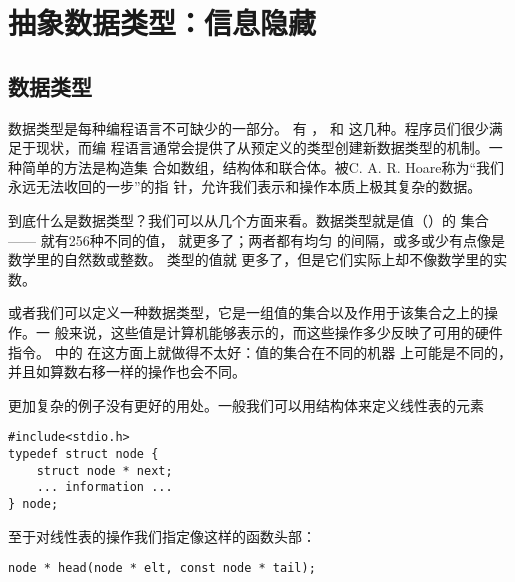 

\chapter{抽象数据类型：信息隐藏}

\section{数据类型}


数据类型是每种编程语言不可缺少的一部分。 有 ，
 和  这几种。程序员们很少满足于现状，而编
程语言通常会提供了从预定义的类型创建新数据类型的机制。一种简单的方法是构造集
合如数组，结构体和联合体。被C. A. R. Hoare称为“我们永远无法收回的一步”的指
针，允许我们表示和操作本质上极其复杂的数据。

到底什么是数据类型？我们可以从几个方面来看。数据类型就是值（）的
集合—— 就有256种不同的值， 就更多了；两者都有均匀
的间隔，或多或少有点像是数学里的自然数或整数。 类型的值就
更多了，但是它们实际上却不像数学里的实数。

或者我们可以定义一种数据类型，它是一组值的集合以及作用于该集合之上的操作。一
般来说，这些值是计算机能够表示的，而这些操作多少反映了可用的硬件指令。
 中的  在这方面上就做得不太好：值的集合在不同的机器
上可能是不同的，并且如算数右移一样的操作也会不同。

更加复杂的例子没有更好的用处。一般我们可以用结构体来定义线性表的元素
\begin{lstlisting}
#include<stdio.h>
typedef struct node {
	struct node * next;
	... information ...
} node;
\end{lstlisting}
至于对线性表的操作我们指定像这样的函数头部：
\begin{lstlisting}
node * head(node * elt, const node * tail);
\end{lstlisting}

